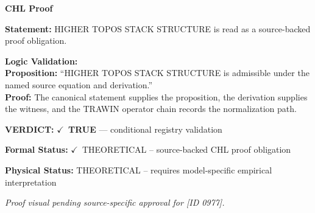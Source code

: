 \vspace{0.45em}
\noindent\textbf{CHL Proof}\par
\textbf{Statement:} HIGHER TOPOS STACK STRUCTURE is read as a source-backed proof obligation.

\textbf{Logic Validation:}\\
\textbf{Proposition:} ``HIGHER TOPOS STACK STRUCTURE is admissible under the named source equation and derivation.''\\
\textbf{Proof:} The canonical statement supplies the proposition, the derivation supplies the witness, and the TRAWIN operator chain records the normalization path.

\textbf{VERDICT:} \ensuremath{\checkmark}\ \textbf{TRUE} --- conditional registry validation

\textbf{Formal Status:} \ensuremath{\checkmark}\ THEORETICAL -- source-backed CHL proof obligation

\textbf{Physical Status:} THEORETICAL -- requires model-specific empirical interpretation
\par\vspace{0.45em}
\par
\vfill
\begingroup\footnotesize\itshape
Proof visual pending source-specific approval for [ID 0977].
\par\endgroup
\vfill
\endgroup
\endgroup
